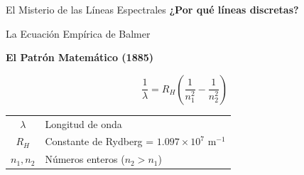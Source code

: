 \documentclass[12pt,aspectratio=169]{beamer}
\begin{document}
\begin{frame}{El Misterio de las Líneas Espectrales}
    \large \textbf{¿Por qué líneas discretas?}
     
    \begin{center}
    \end{center}
       
\end{frame}

\begin{frame}{La Ecuación Empírica de Balmer}
    \begin{center}
        \large \textbf{El Patrón Matemático (1885)}
    \end{center}
    
    \begin{center}
        \colorbox{azuloscuro!10}{\parbox{0.8\textwidth}{
            \begin{center}
                \Huge \textcolor{azuloscuro}{
                    $$\frac{1}{\lambda} = R_H\left(\frac{1}{n_1^2} - \frac{1}{n_2^2}\right)$$
                }
            \end{center}
        }}
    \end{center}
        
\end{frame}

\begin{frame}
\vspace{1cm}
    \begin{center}
        \begin{tabular}{cl}
            \Large $\lambda$ & \Large Longitud de onda \\[0.3cm]
            \Large $R_H$ & \Large Constante de Rydberg = $1.097 \times 10^7$ m$^{-1}$ \\[0.3cm]
            \Large $n_1, n_2$ & \Large Números enteros ($n_2 > n_1$)
        \end{tabular}
    \end{center}
\end{frame}
\end{document}
